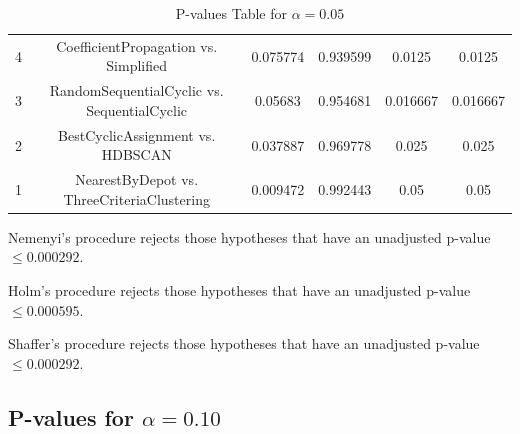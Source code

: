 \documentclass[a4paper,10pt]{article}
\begin{document}
\begin{landscape}
\begin{table}[!htp]
\begin{tabular}{cccccc}
4&CoefficientPropagation vs. Simplified&0.075774&0.939599&0.0125&0.0125\\
3&RandomSequentialCyclic vs. SequentialCyclic&0.05683&0.954681&0.016667&0.016667\\
2&BestCyclicAssignment vs. HDBSCAN&0.037887&0.969778&0.025&0.025\\
1&NearestByDepot vs. ThreeCriteriaClustering&0.009472&0.992443&0.05&0.05\\
\hline
\end{tabular}
\caption{P-values Table for $\alpha=0.05$}
\end{table}Nemenyi's procedure rejects those hypotheses that have an unadjusted p-value $\le0.000292$.

Holm's procedure rejects those hypotheses that have an unadjusted p-value $\le0.000595$.

Shaffer's procedure rejects those hypotheses that have an unadjusted p-value $\le0.000292$.

\pagebreak

\subsection{P-values for $\alpha=0.10$}


\end{landscape}
\end{document}
